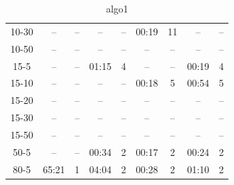 \documentclass[
  digital, %
  oneside, %
  notable,   %
  lof,     %
  nolot,     %
]{fithesis3}
\begin{document}
\begin{table}[]
{\begin{tabular}{c|cc|cc|cc|cc}
10-30  & --  &  --  & --  &  --  & 00:19  &  11  & --  &  -- \\
10-50  & --  &  --  & --  &  --  & --  &  --  & --  &  --  \\ \hline
15-5  & --  &  --  & 01:15  &  4  & --  &  --  & 00:19  &  4  \\
15-10  & --  &  --  & --  &  --  & 00:18  &  5  & 00:54  &  5  \\
15-20  & --  &  --  & --  &  --  & --  &  --  & --  &  --  \\
15-30  & --  &  --  & --  &  --  & --  &  --  & --  &  --  \\
15-50  & --  &  --  & --  &  --  & --  &  --  & --  &  --  \\ \hline
50-5  & --  &  --  & 00:34  &  2  & 00:17  &  2  & 00:24  &  2  \\ \hline
80-5  & 65:21  &  1  & 04:04  &  2  & 00:28  &  2  & 01:10  &  2 \\


\end{tabular}%
}
\caption{algo1}
\label{tab:algo1}
\end{table}
\end{document}
